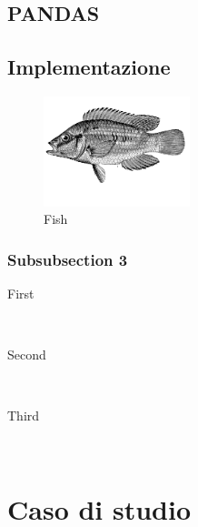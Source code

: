 \documentclass[12pt]{article} %
\begin{document}
	\subsection{PANDAS} %

		\lipsum[6] %

	\subsection{Implementazione} %

		\lipsum[6] %
		\begin{figure} %
			\begin{center}
		    	\includegraphics[width=0.38\textwidth]{fish}
			\end{center}
			\caption{Fish}
		\end{figure}
		\lipsum[7-8] %

		\subsubsection{Subsubsection 3} %

			\begin{description} %

				\item[First] \hfill \\
				\lipsum[9] %
				
				\item[Second] \hfill \\
				\lipsum[10] %
				
				\item[Third] \hfill \\
				\lipsum[11] %
			
			\end{description} 

\section{Caso di studio} %
\end{document}
